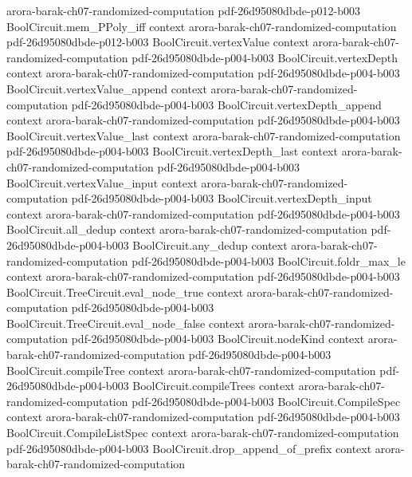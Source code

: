 \begin{theorem}
  {arora-barak-ch07-randomized-computation}
  {pdf-26d95080dbde-p012-b003}
\proofstep
  {BoolCircuit.mem_PPoly_iff}
  {context}
  {arora-barak-ch07-randomized-computation}
  {pdf-26d95080dbde-p012-b003}
\proofstep
  {BoolCircuit.vertexValue}
  {context}
  {arora-barak-ch07-randomized-computation}
  {pdf-26d95080dbde-p004-b003}
\proofstep
  {BoolCircuit.vertexDepth}
  {context}
  {arora-barak-ch07-randomized-computation}
  {pdf-26d95080dbde-p004-b003}
\proofstep
  {BoolCircuit.vertexValue_append}
  {context}
  {arora-barak-ch07-randomized-computation}
  {pdf-26d95080dbde-p004-b003}
\proofstep
  {BoolCircuit.vertexDepth_append}
  {context}
  {arora-barak-ch07-randomized-computation}
  {pdf-26d95080dbde-p004-b003}
\proofstep
  {BoolCircuit.vertexValue_last}
  {context}
  {arora-barak-ch07-randomized-computation}
  {pdf-26d95080dbde-p004-b003}
\proofstep
  {BoolCircuit.vertexDepth_last}
  {context}
  {arora-barak-ch07-randomized-computation}
  {pdf-26d95080dbde-p004-b003}
\proofstep
  {BoolCircuit.vertexValue_input}
  {context}
  {arora-barak-ch07-randomized-computation}
  {pdf-26d95080dbde-p004-b003}
\proofstep
  {BoolCircuit.vertexDepth_input}
  {context}
  {arora-barak-ch07-randomized-computation}
  {pdf-26d95080dbde-p004-b003}
\proofstep
  {BoolCircuit.all_dedup}
  {context}
  {arora-barak-ch07-randomized-computation}
  {pdf-26d95080dbde-p004-b003}
\proofstep
  {BoolCircuit.any_dedup}
  {context}
  {arora-barak-ch07-randomized-computation}
  {pdf-26d95080dbde-p004-b003}
\proofstep
  {BoolCircuit.foldr_max_le}
  {context}
  {arora-barak-ch07-randomized-computation}
  {pdf-26d95080dbde-p004-b003}
\proofstep
  {BoolCircuit.TreeCircuit.eval_node_true}
  {context}
  {arora-barak-ch07-randomized-computation}
  {pdf-26d95080dbde-p004-b003}
\proofstep
  {BoolCircuit.TreeCircuit.eval_node_false}
  {context}
  {arora-barak-ch07-randomized-computation}
  {pdf-26d95080dbde-p004-b003}
\proofstep
  {BoolCircuit.nodeKind}
  {context}
  {arora-barak-ch07-randomized-computation}
  {pdf-26d95080dbde-p004-b003}
\proofstep
  {BoolCircuit.compileTree}
  {context}
  {arora-barak-ch07-randomized-computation}
  {pdf-26d95080dbde-p004-b003}
\proofstep
  {BoolCircuit.compileTrees}
  {context}
  {arora-barak-ch07-randomized-computation}
  {pdf-26d95080dbde-p004-b003}
\proofstep
  {BoolCircuit.CompileSpec}
  {context}
  {arora-barak-ch07-randomized-computation}
  {pdf-26d95080dbde-p004-b003}
\proofstep
  {BoolCircuit.CompileListSpec}
  {context}
  {arora-barak-ch07-randomized-computation}
  {pdf-26d95080dbde-p004-b003}
\proofstep
  {BoolCircuit.drop_append_of_prefix}
  {context}
  {arora-barak-ch07-randomized-computation}

\end{theorem}
